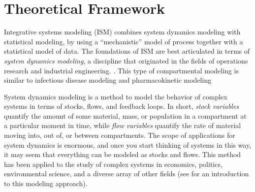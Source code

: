 \chapter{Theoretical Framework}
\label{theory-system_dynamics}

Integrative systems modeling (ISM) combines system dynamics modeling
with statistical modeling, by using a ``mechanistic'' model of process
together with a statistical model of data.  The foundations of ISM are
best articulated in terms of \emph{system dynamics modeling}, a
discipline that originated in the fields of operations research and
industrial engineering. \cite{Forrester 1961. Industrial
  dynamics. Waltham, MA: Pegasus Communications} \cite{Forrester
  1969. Urban Dynamics. Pegasus Communications} \cite{Forrester
  1971. World Dynamics. Wright-Allen Press} \cite{Forrester
  1971. World Dynamics. Wright-Allen Press}
\cite{Meadows_Thinking_2008}.  This type of compartmental modeling is
similar to infectious disease modeling \cite{andersen and may -
  infectiuos disease in humans} \cite{keeling and rohani - Modeling
  Infectious Diseases in Humans and Animals} \cite{An Introduction to
  Infectious Disease Modelling - Vynnycky and White}
\cite{Mathematical Epidemiology of Infectious Diseases: Model
  Building, Analysis and Interpretation Diekmann Heesterbeek} and
pharmacokinetic modeling \cite{Compartmental Analysis in Biology and
  Medicine 3rd Edition - John A. Jacquez}
\cite{Jacquez_Modeling_1999}

System dynamics modeling is a method to model the behavior of complex
systems in terms of stocks, flows, and feedback loops.  In short,
\emph{stock variables} quantify the amount of some material, mass,
or population in a compartment at a particular moment in time, while
\emph{flow variables} quantify the rate of material moving into, out
of, or between compartments. The scope of applications for system
dynamics is enormous, and once you start thinking of systems in this
way, it may seem that everything can be modeled as stocks and
flows. This method has been applied to the study of complex systems in
economics, politics, environmental science, and a diverse array of
other fields (see
\cite{Meadows_Thinking_2008,Jacquez_Modeling_1999,Harte_Consider_1988}
for an introduction to this modeling approach).

